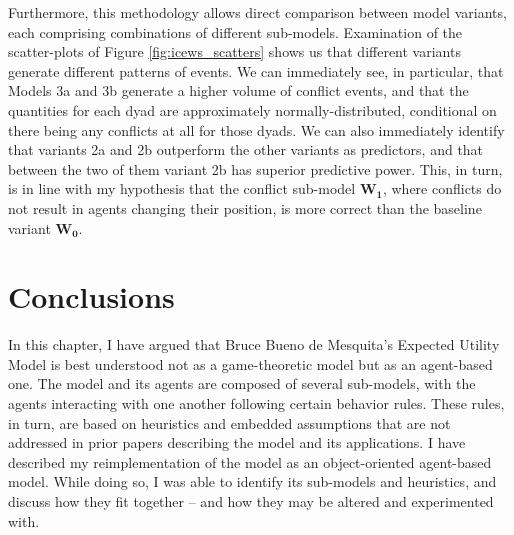 Furthermore, this methodology allows direct comparison between model variants, each comprising combinations of different sub-models. Examination of the scatter-plots of Figure \ref{fig:icews_scatters} shows us that different variants generate different patterns of events. We can immediately see, in particular, that Models 3a and 3b generate a higher volume of conflict events, and that the quantities for each dyad are approximately normally-distributed, conditional on there being any conflicts at all for those dyads. We can also immediately identify that variants 2a and 2b outperform the other variants as predictors, and that between the two of them variant 2b has superior predictive power. This, in turn, is in line with my hypothesis that the conflict sub-model $\mathbf{W_1}$, where conflicts do not result in agents changing their position, is more correct than the baseline variant $\mathbf{W_0}$.

\section{Conclusions}

In this chapter, I have argued that Bruce Bueno de Mesquita's Expected Utility Model is best understood not as a game-theoretic model but as an agent-based one. The model and its agents are composed of several sub-models, with the agents interacting with one another following certain behavior rules. These rules, in turn, are based on heuristics and embedded assumptions that are not addressed in prior papers describing the model and its applications. I have described my reimplementation of the model as an object-oriented agent-based model. While doing so, I was able to identify its sub-models and heuristics, and discuss how they fit together -- and how they may be altered and experimented with.

